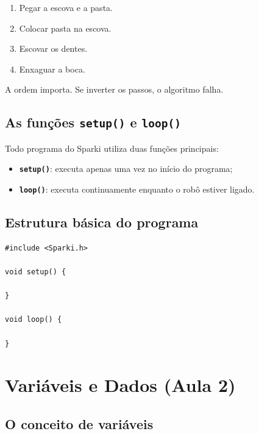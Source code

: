 \documentclass[conference]{IEEEtran}
\begin{document}
\begin{enumerate}[label=\arabic*.]
    \item Pegar a escova e a pasta.
    \item Colocar pasta na escova.
    \item Escovar os dentes.
    \item Enxaguar a boca.
\end{enumerate}

A ordem importa. Se inverter os passos, o algoritmo falha.

\subsection{As funções \texttt{setup()} e \texttt{loop()}}

Todo programa do Sparki utiliza duas funções principais:

\begin{itemize}
    \item \textbf{\texttt{setup()}}: executa apenas uma vez no início do programa;
    \item \textbf{\texttt{loop()}}: executa continuamente enquanto o robô estiver ligado.
\end{itemize}

\subsection{Estrutura básica do programa}

\begin{lstlisting}[caption={Estrutura básica do código}]
#include <Sparki.h>

void setup() {

}

void loop() {

}
\end{lstlisting}

\vspace{0.5cm}

\section{Variáveis e Dados (Aula 2)}

\subsection{O conceito de variáveis}
\end{document}
